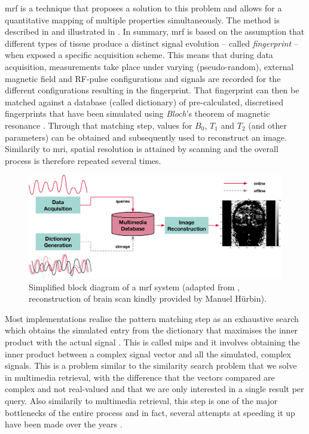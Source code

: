 \acrfull{mrf} is a technique \cite{Ma:2013Magnetic} that proposes a solution to this problem and allows for a quantitative mapping of multiple properties simultaneously. The method is described in \cite{Bipin:2019Magnetic} and illustrated in . In summary, \acrshort{mrf} is based on the assumption that different types of tissue produce a distinct signal evolution -- called \emph{fingerprint} -- when exposed a specific acquisition scheme. This means that during data acquisition, measurements take place under varying (pseudo-random), external magnetic field and RF-pulse configurations and signals are recorded for the different configurations resulting in the fingerprint. That fingerprint can then be matched against a database (called dictionary) of pre-calculated, discretised fingerprints that have been simulated using \emph{Bloch}'s theorem of magnetic resonance \cite{Bloch:1946Nuclear}. Through that matching step, values for $B_0$, $T_1$ and $T_2$ (and other parameters) can be obtained and subsequently used to reconstruct an image. Similarily to \acrshort{mri}, spatial resolution is attained by scanning and the overall process is therefore repeated several times.

\begin{figure}[tb]
    \centering
    \includegraphics[width=\textwidth]{figures/mrf.eps}
    \caption{Simplified block diagram of a \acrshort{mrf} system (adapted from \cite{Bipin:2019Magnetic}, reconstruction of brain scan kindly provided by Manuel Hürbin).}
    \label{figure:mrf}
\end{figure}

Most implementations realise the pattern matching step as an exhaustive search which obtains the simulated entry from the dictionary that maximises the inner product with the actual signal \cite{Bipin:2019Magnetic}. This is called \acrfull{mips} and it involves obtaining the inner product between a complex signal vector and all the simulated, complex signals. This is a problem similar to the similarity search problem that we solve in multimedia retrieval, with the difference that the vectors compared are complex and not real-valued and that we are only interested in a single result per query. Also similarily to multimedia retrieval, this step is one of the major bottlenecks of the entire process and in fact, several attempts at speeding it up have been made over the years \cite{Mcgivney:2014SVD}.

